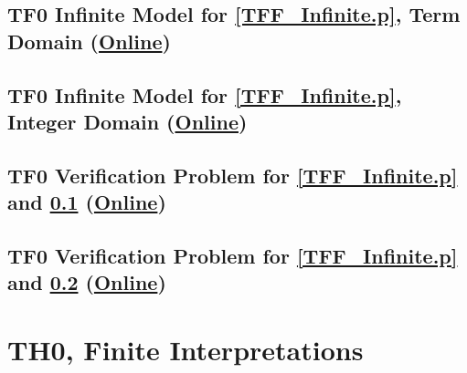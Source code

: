 \documentclass{easychair}
\begin{document}
\newpage
\subsection{TF0 Infinite Model for \ref{TFF_Infinite.p}, Term Domain
(\href{https://raw.githubusercontent.com/GeoffsPapers/InterpretationFormat/master/Examples/TFF_Peano.s}{Online})}
\label{TFF_Peano.s}
\begin{small}

\end{small}

\newpage
\subsection{TF0 Infinite Model for \ref{TFF_Infinite.p}, Integer Domain
(\href{https://raw.githubusercontent.com/GeoffsPapers/InterpretationFormat/master/Examples/TFF_Integer.s}{Online})}
\label{TFF_Integer.s}
\begin{small}

\end{small}

\newpage
\subsection{TF0 Verification Problem for \ref{TFF_Infinite.p} and \ref{TFF_Peano.s}
(\href{https://raw.githubusercontent.com/GeoffsPapers/InterpretationFormat/master/Examples/TFF_Peano.s.p}{Online})}
\label{TFF_Peano.s.p}
\begin{small}

\end{small}

\newpage
\subsection{TF0 Verification Problem for \ref{TFF_Infinite.p} and \ref{TFF_Integer.s}
(\href{https://raw.githubusercontent.com/GeoffsPapers/InterpretationFormat/master/Examples/TFF_Integer.s.p}{Online})}
\label{TFF_Integer.s.p}
\begin{small}

\end{small}

\newpage
\section{TH0, Finite Interpretations}
\label{TH0Finite}
\end{document}

